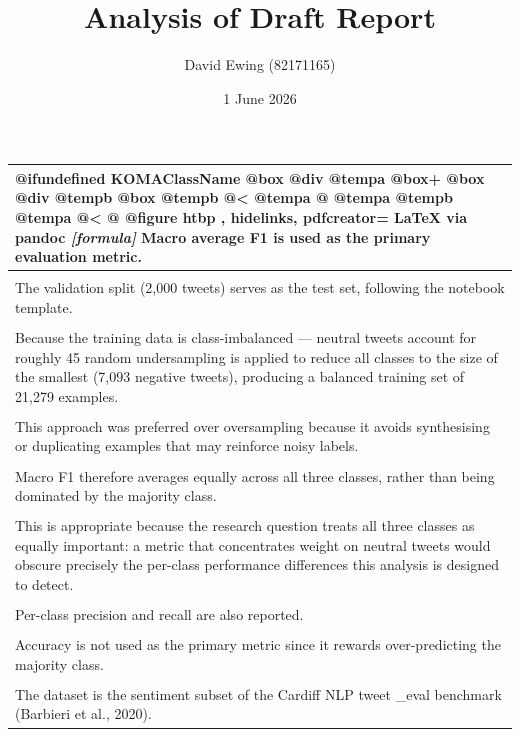 \documentclass[11pt,a4paper,landscape]{article}
\title{Analysis of Draft Report}
\author{David Ewing (82171165)}
\date{1 June 2026}
\begin{document}
\maketitle
\thispagestyle{empty}
\newpage

\begin{longtable}{|p{\dimexpr\linewidth-2\tabcolsep-2\arrayrulewidth\relax}|}
\hline
@ifundefined KOMAClassName @box @div @tempa @box+ @box @div @tempb @box @tempb @< @tempa @ @tempa @tempb @tempa @< @ @figure htbp , hidelinks, pdfcreator= LaTeX via pandoc \textit{[formula]} Macro average F1 is used as the primary evaluation metric. \\[2pt]
\hline
\rule{0pt}{3.5cm} \\
\hline
The validation split (2,000 tweets) serves as the test set, following the notebook template. \\[2pt]
\hline
\rule{0pt}{3.5cm} \\
\hline
Because the training data is class-imbalanced --- neutral tweets account for roughly 45 random undersampling is applied to reduce all classes to the size of the smallest (7,093 negative tweets), producing a balanced training set of 21,279 examples. \\[2pt]
\hline
\rule{0pt}{3.5cm} \\
\hline
This approach was preferred over oversampling because it avoids synthesising or duplicating examples that may reinforce noisy labels. \\[2pt]
\hline
\rule{0pt}{3.5cm} \\
\hline
Macro F1 therefore averages equally across all three classes, rather than being dominated by the majority class. \\[2pt]
\hline
\rule{0pt}{3.5cm} \\
\hline
This is appropriate because the research question treats all three classes as equally important: a metric that concentrates weight on neutral tweets would obscure precisely the per-class performance differences this analysis is designed to detect. \\[2pt]
\hline
\rule{0pt}{3.5cm} \\
\hline
Per-class precision and recall are also reported. \\[2pt]
\hline
\rule{0pt}{3.5cm} \\
\hline
Accuracy is not used as the primary metric since it rewards over-predicting the majority class. \\[2pt]
\hline
\rule{0pt}{3.5cm} \\
\hline
The dataset is the sentiment subset of the Cardiff NLP tweet \_eval benchmark (Barbieri et al., 2020). \\[2pt]

\end{longtable}
\end{document}
